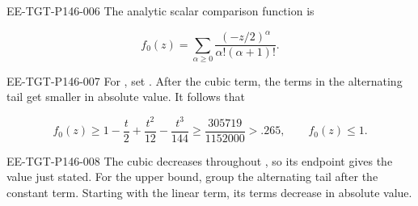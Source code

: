 \begin{EESegment}{EE-TGT-P146-006}
The analytic scalar comparison function is
\end{EESegment}
\begin{equation*}
  f_0(z)=\sum_{\alpha\geq0}\frac{(-z/2)^\alpha}{\alpha!(\alpha+1)!}.
\end{equation*}
\begin{EESegment}{EE-TGT-P146-007}
For , set . After the cubic term,
the terms in the alternating tail get smaller in absolute value. It follows that
\end{EESegment}
\begin{equation}
  f_0(z)\geq1-\frac t2+\frac{t^2}{12}-\frac{t^3}{144}
  \geq\frac{305719}{1152000}>.265,
  \qquad f_0(z)\leq1.
  \tag{B.11}\label{eq:B.11}
\end{equation}
\begin{EESegment}{EE-TGT-P146-008}
The cubic decreases throughout , so its endpoint gives the value just
stated. For the upper bound, group the alternating tail after the constant term. Starting with the
linear term, its terms decrease in absolute value.
\end{EESegment}

